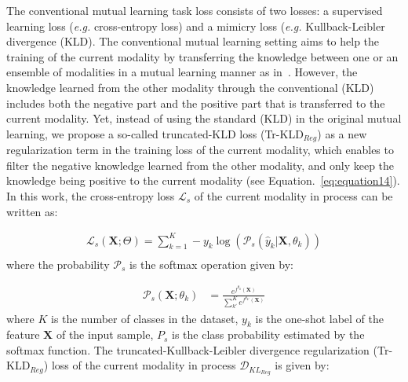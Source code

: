 \documentclass[twocolumn]{svjour3}
\newcommand{\eg}{\textit{e.g. }}
\begin{document}
The conventional mutual learning task loss consists of two losses: a supervised learning loss (\eg cross-entropy loss) and a mimicry loss (\eg Kullback-Leibler divergence (KLD). The conventional mutual learning setting aims to help the training of the current modality by transferring the knowledge between one or an ensemble of modalities in a mutual learning manner as in~\cite{zhang2018deep}. However, the knowledge learned from the other modality through the conventional (KLD) includes both the negative part and the positive part that is transferred to the current modality. Yet, instead of using the standard (KLD) in the original mutual learning, we propose a so-called truncated-KLD loss (Tr-KLD$_{Reg}$) as a new regularization term in the training loss of the current modality, which enables to filter the negative knowledge learned from the other modality, and only keep the knowledge being positive to the current modality (see Equation.~\ref{eq:equation14}). In this work, the cross-entropy loss $\mathcal{L}_{s}$ of the current modality in process can be written as:

\begin{equation}
\begin{split}
\mathcal{L}_{s}(\mathbf{X};\Theta)
= \sum^{K}_{k=1}-y_k\log(\mathcal{P}_{s}(\hat y_k|\mathbf{X},\theta_k)) \\ 
\end{split}
\label{eq:equation12}
\end{equation}
where the probability $\mathcal{P}_{s}$ is the softmax operation given by:
 
\begin{equation}
 \begin{split}
 \mathcal{P}_{s}(\mathbf{X};\theta_k)
 &= \frac{e^{f^{\theta_k}(\mathbf{X})}}{\sum^{K}_{k'} e^{f^{\theta_{k'}}(\mathbf{X})}}
 \end{split}
 \label{eq:equation13}
 \end{equation}
where $K$ is the number of classes in the dataset, ${y_k}$ is the one-shot label of the feature $\mathbf{X}$ of the input sample, $P_{s}$ is the class probability estimated by the softmax function.
The truncated-Kullback-Leibler divergence regularization (Tr-KLD$_{Reg}$) loss of the current modality in process $\mathcal{D}_{{KL}_{Reg}}$ is given by:
\end{document}
